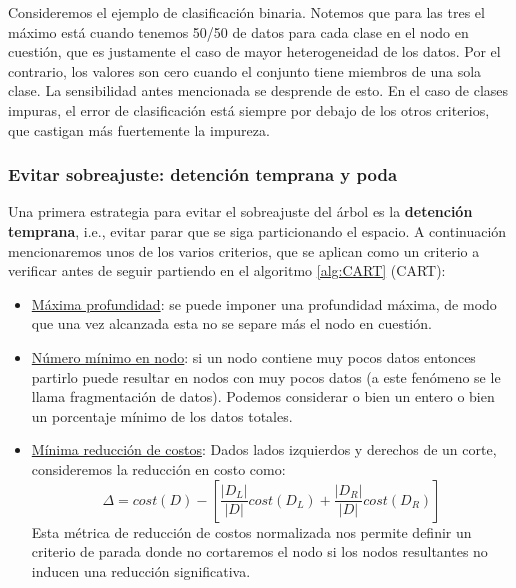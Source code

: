 Consideremos el ejemplo de clasificación binaria.  %
Notemos que para las tres el máximo está cuando tenemos 50/50 de datos para cada clase en el nodo en cuestión, que es justamente el caso de mayor heterogeneidad de los datos. Por el contrario, los valores son cero cuando el conjunto tiene miembros de una sola clase. La sensibilidad antes mencionada se desprende de esto. En el caso de clases impuras, el error de clasificación está siempre por debajo de los otros criterios, que castigan más fuertemente la impureza.



\subsubsection{Evitar sobreajuste: detención temprana y poda}

Una primera estrategia para evitar el sobreajuste del árbol es la \textbf{detención temprana}, i.e., evitar parar que se siga particionando el espacio. A continuación mencionaremos unos de los varios criterios, que se aplican como un criterio a verificar antes de seguir partiendo en el algoritmo \ref{alg:CART} (CART):

\begin{itemize}
    \item \underline{Máxima profundidad}:
    se puede imponer una profundidad máxima, de modo que una vez alcanzada esta no se separe más el nodo en cuestión.

    \item \underline{Número mínimo en nodo}: si un nodo contiene muy pocos datos entonces partirlo puede resultar en nodos con muy pocos datos (a este fenómeno se le llama fragmentación de datos). Podemos considerar o bien un entero o bien un porcentaje mínimo de los datos totales.

    \item \underline{Mínima reducción de costos}: Dados lados izquierdos y derechos de un corte, consideremos la reducción en costo como:
    \begin{equation}
        \Delta = cost(D) - \left[ \frac{|D_L|}{|D|} cost(D_L) + \frac{|D_R|}{|D|} cost(D_R) \right]
    \end{equation}
    Esta métrica de reducción de costos normalizada nos permite definir un criterio de parada donde no cortaremos el nodo si los nodos resultantes no inducen una reducción significativa. 
\end{itemize}

